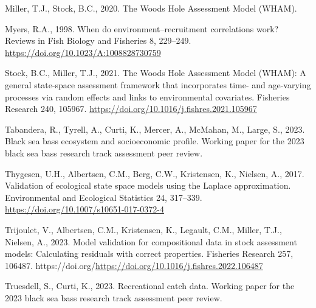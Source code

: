 \documentclass[
]{article}
\newlength{\cslhangindent}
\newlength{\cslentryspacingunit} %
\newenvironment{CSLReferences}[2] %
 {%
  \setlength{\parindent}{0pt}
  \ifodd #1
  \let\oldpar\par
  \def\par{\hangindent=\cslhangindent\oldpar}
  \fi
  \setlength{\parskip}{#2\cslentryspacingunit}
 }%
 {}
\begin{document}
\begin{CSLReferences}{1}{0}
\leavevmode{}%
Miller, T.J., Stock, B.C., 2020. The {Woods Hole Assessment Model} ({WHAM}).

\leavevmode{}%
Myers, R.A., 1998. When do environment--recruitment correlations work? Reviews in Fish Biology and Fisheries 8, 229--249. \url{https://doi.org/10.1023/A:1008828730759}

\leavevmode{}%
Stock, B.C., Miller, T.J., 2021. The {Woods Hole Assessment Model} ({WHAM}): A general state-space assessment framework that incorporates time- and age-varying processes via random effects and links to environmental covariates. Fisheries Research 240, 105967. \url{https://doi.org/10.1016/j.fishres.2021.105967}

\leavevmode{}%
Tabandera, R., Tyrell, A., Curti, K., Mercer, A., McMahan, M., Large, S., 2023. Black sea bass ecosystem and socioeconomic profile. Working paper for the 2023 black sea bass research track assessment peer review.

\leavevmode{}%
Thygesen, U.H., Albertsen, C.M., Berg, C.W., Kristensen, K., Nielsen, A., 2017. {Validation of ecological state space models using the Laplace approximation}. Environmental and Ecological Statistics 24, 317--339. \url{https://doi.org/10.1007/s10651-017-0372-4}

\leavevmode{}%
Trijoulet, V., Albertsen, C.M., Kristensen, K., Legault, C.M., Miller, T.J., Nielsen, A., 2023. Model validation for compositional data in stock assessment models: Calculating residuals with correct properties. Fisheries Research 257, 106487. https://doi.org/\url{https://doi.org/10.1016/j.fishres.2022.106487}

\leavevmode{}%
Truesdell, S., Curti, K., 2023. Recreational catch data. Working paper for the 2023 black sea bass research track assessment peer review.

\end{CSLReferences}

\pagebreak
\end{document}
